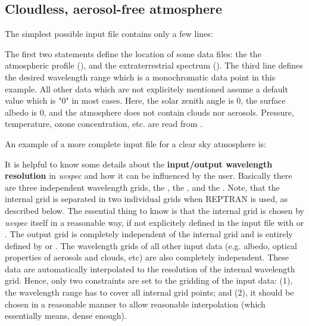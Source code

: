 \subsection{Cloudless, aerosol-free atmosphere}

The simplest possible input file contains only a few lines:

The first two statements define the location of some data files: the
the atmospheric profile
(), 
and the extraterrestrial spectrum 
(). The third line
defines the desired wavelength range which is a monochromatic data
point in this example. All other data which are not explicitely
mentioned assume a default value which is "0" in most cases. Here, the
solar zenith angle is 0, the surface albedo is 0, and the atmosphere
does not contain clouds nor aerosols. Pressure, temperature, ozone
concentration, etc. are read from .

An example of a more complete input file for a clear sky atmosphere is:



It is helpful to know some details about the {\bf input/output
wavelength resolution} in {\sl uvspec} and how it can be influenced
by the user. Basically there are three independent wavelength grids,
the , the , and the
. Note, that the internal grid is separated in 
two individual grids when REPTRAN is used, as described below.
The essential thing to know is that the internal
grid is chosen by {\sl uvspec} itself in a reasonable way, if not
explicitely defined in the input file with
 or . The
output grid is completely independent of the internal grid and is
entirely defined by  or . 
The wavelength grids of all
other input data (e.g. albedo, optical properties of aerosols and
clouds, etc) are also completely independent. These data are
automatically interpolated to the resolution of the internal
wavelength grid. Hence, only two constraints are set to the gridding
of the input data: (1), the wavelength range has to cover all internal
grid points; and (2), it should be chosen in a reasonable manner to
allow reasonable interpolation (which essentially means, dense
enough).

